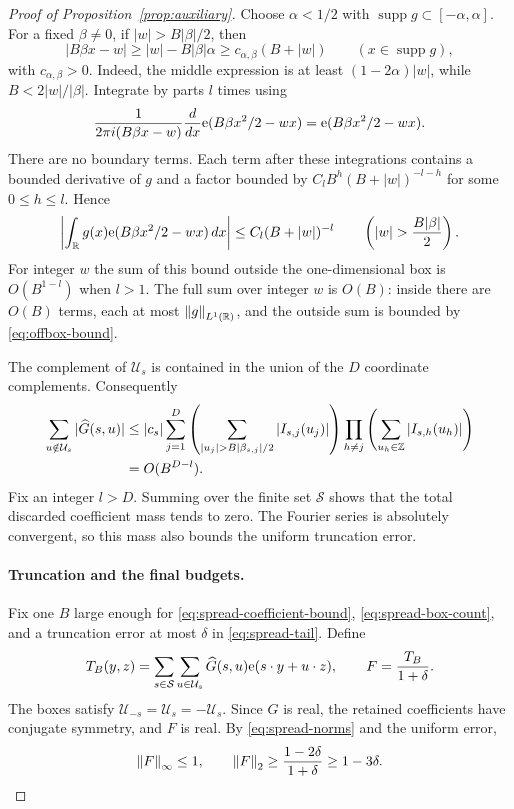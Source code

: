 \begin{proof}[Proof of Proposition~\ref{prop:auxiliary}]
Choose $\alpha<1/2$ with $\operatorname{supp}g\subset[-\alpha,\alpha]$.
For a fixed $\beta\ne0$, if $|w|>B|\beta|/2$, then
\begin{equation}
 \label{eq:offbox-derivative}
 |B\beta x-w|\ge |w|-B|\beta|\alpha
 \ge c_{\alpha,\beta}(B+|w|)
 \qquad(x\in\operatorname{supp}g),
\end{equation}
with $c_{\alpha,\beta}>0$.  Indeed, the middle expression is at
least $(1-2\alpha)|w|$, while $B<2|w|/|\beta|$.
Integrate by parts $l$ times using
\[
 \frac{1}{2\pi i(B\beta x-w)}\frac{d}{dx}
   \mathrm e(B\beta x^2/2-wx)=\mathrm e(B\beta x^2/2-wx).
\]
There are no boundary terms.  Each term after these integrations
contains a bounded derivative of $g$ and a factor bounded by
$C_l B^h(B+|w|)^{-l-h}$ for some $0\le h\le l$.  Hence
\begin{equation}
 \label{eq:offbox-bound}
 \left|\int_{\R}g(x)\e(B\beta x^2/2-wx)\,dx\right|
 \le C_l(B+|w|)^{-l}
 \qquad\left(|w|>\frac{B|\beta|}{2}\right).
\end{equation}
For integer $w$ the sum of this bound outside the one-dimensional
box is $O(B^{1-l})$ when $l>1$.  The full sum over integer $w$ is
$O(B)$: inside there are $O(B)$ terms, each at most $\left\lVert g\right\rVert_{L^1(\mathbb R)}$,
and the outside sum is bounded by \eqref{eq:offbox-bound}.

The complement of $\mathcal U_s$ is contained in the union of the
$D$ coordinate complements.  Consequently
\begin{align}
 \sum_{u\notin\mathcal U_s}|\widehat G(s,u)|
 &\le |c_s|\sum_{j=1}^D
 \left(\sum_{|u_j|>B|\beta_{s,j}|/2}|I_{s,j}(u_j)|\right)
 \prod_{h\ne j}\left(\sum_{u_h\in\Z}|I_{s,h}(u_h)|\right)
 \notag\\
 &=O(B^{D-l}).
 \label{eq:spread-tail}
\end{align}
Fix an integer $l>D$.  Summing over the finite set $\mathcal S$
shows that the total discarded coefficient mass tends to zero.
The Fourier series is absolutely convergent, so this mass also
bounds the uniform truncation error.

\paragraph{Truncation and the final budgets.}
Fix one $B$ large enough for \eqref{eq:spread-coefficient-bound},
\eqref{eq:spread-box-count}, and a truncation error at most $\delta$
in \eqref{eq:spread-tail}.  Define
\[
 T_B(y,z)=\sum_{s\in\mathcal S}\sum_{u\in\mathcal U_s}
              \widehat G(s,u)\mathrm e(s\cdot y+u\cdot z),
 \qquad F=\frac{T_B}{1+\delta}.
\]
The boxes satisfy $\mathcal U_{-s}=\mathcal U_s=-\mathcal U_s$.
Since $G$ is real, the retained coefficients have conjugate symmetry,
and $F$ is real.  By \eqref{eq:spread-norms} and the uniform error,
\[
 \left\lVert F\right\rVert_\infty\le1,
 \qquad
 \left\lVert F\right\rVert_2\ge\frac{1-2\delta}{1+\delta}\ge1-3\delta.
\]


\end{proof}
